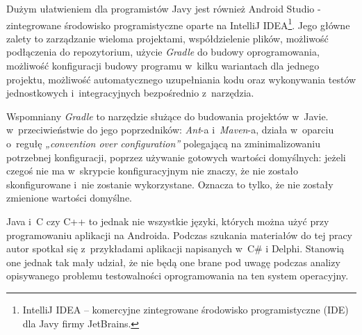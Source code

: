Dużym ułatwieniem dla programistów Javy jest również Android Studio - zintegrowane środowisko programistyczne oparte na IntelliJ IDEA\footnote{IntelliJ IDEA – komercyjne zintegrowane środowisko programistyczne (IDE) dla Javy firmy JetBrains.}. Jego główne zalety to zarządzanie wieloma projektami, współdzielenie plików, możliwość podłączenia do repozytorium, użycie \textit{Gradle} do budowy oprogramowania, możliwość konfiguracji budowy programu w~kilku wariantach dla jednego projektu, możliwość automatycznego uzupełniania kodu oraz wykonywania testów jednostkowych i~integracyjnych bezpośrednio z~narzędzia.

Wspomniany \textit{Gradle} to narzędzie służące do budowania projektów w~Javie. w~przeciwieństwie do jego poprzedników: \textit{Ant}-a i~\textit{Maven}-a, działa w~oparciu o~regułę \textit{„convention over configuration”} polegającą na zminimalizowaniu potrzebnej konfiguracji, poprzez używanie gotowych wartości domyślnych: jeżeli czegoś nie ma w~skrypcie konfiguracyjnym nie znaczy, że nie zostało skonfigurowane i~nie zostanie wykorzystane. Oznacza to tylko, że nie zostały zmienione wartości domyślne.

Java i~C czy C++ to jednak nie wszystkie języki, których można użyć przy programowaniu aplikacji na Androida. Podczas szukania materiałów do tej pracy autor spotkał się z~przykładami aplikacji napisanych w~C\# i Delphi. Stanowią one jednak tak mały udział, że nie będą one brane pod uwagę podczas analizy opisywanego problemu testowalności oprogramowania na ten system operacyjny.





